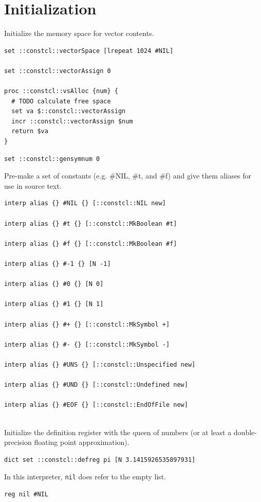 \documentclass[twoside,9pt]{report}
\begin{document}
\chapter{Initialization}
\label{initialization}

Initialize the memory space for vector contents.

\noindent\makebox[\linewidth]{\rule{\linewidth}{0.4pt}}
\begin{lstlisting}
set ::constcl::vectorSpace [lrepeat 1024 #NIL]
 
set ::constcl::vectorAssign 0
 
proc ::constcl::vsAlloc {num} {
  # TODO calculate free space
  set va $::constcl::vectorAssign
  incr ::constcl::vectorAssign $num
  return $va
}
\end{lstlisting}
\noindent\makebox[\linewidth]{\rule{\linewidth}{0.4pt}}
\noindent\makebox[\linewidth]{\rule{\linewidth}{0.4pt}}
\begin{lstlisting}
set ::constcl::gensymnum 0
\end{lstlisting}
\noindent\makebox[\linewidth]{\rule{\linewidth}{0.4pt}}

Pre-make a set of constants (e.g. \#NIL, \#t, and \#f) and give them aliases for use in source text.

\noindent\makebox[\linewidth]{\rule{\linewidth}{0.4pt}}
\begin{lstlisting}
interp alias {} #NIL {} [::constcl::NIL new]
 
interp alias {} #t {} [::constcl::MkBoolean #t]
 
interp alias {} #f {} [::constcl::MkBoolean #f]
 
interp alias {} #-1 {} [N -1]
 
interp alias {} #0 {} [N 0]
 
interp alias {} #1 {} [N 1]
 
interp alias {} #+ {} [::constcl::MkSymbol +]
 
interp alias {} #- {} [::constcl::MkSymbol -]
 
interp alias {} #UNS {} [::constcl::Unspecified new]
 
interp alias {} #UND {} [::constcl::Undefined new]
 
interp alias {} #EOF {} [::constcl::EndOfFile new]
 
\end{lstlisting}
\noindent\makebox[\linewidth]{\rule{\linewidth}{0.4pt}}

Initialize the definition register with the queen of numbers (or at least a double-precision floating point approximation).

\noindent\makebox[\linewidth]{\rule{\linewidth}{0.4pt}}
\begin{lstlisting}
dict set ::constcl::defreg pi [N 3.1415926535897931]
\end{lstlisting}
\noindent\makebox[\linewidth]{\rule{\linewidth}{0.4pt}}

In this interpreter, \texttt{nil} does refer to the empty list.

\noindent\makebox[\linewidth]{\rule{\linewidth}{0.4pt}}
\begin{lstlisting}
reg nil #NIL
\end{lstlisting}
\noindent\makebox[\linewidth]{\rule{\linewidth}{0.4pt}}
\end{document}
